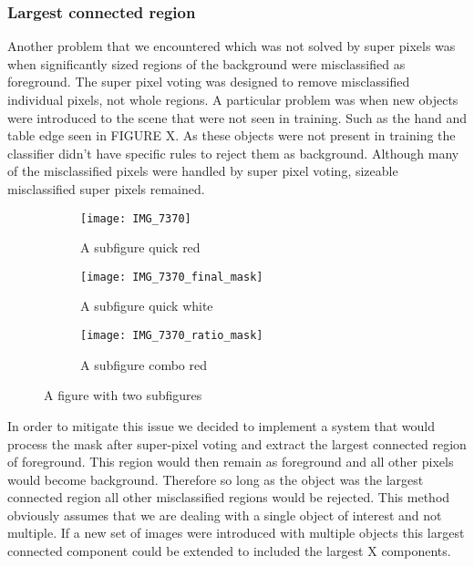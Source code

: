 \documentclass[12pt]{IIBproject}
\begin{document}
\subsubsection{Largest connected region}
Another problem that we encountered which was not solved by super pixels was when significantly sized regions of the background were misclassified as foreground. The super pixel voting was designed to remove misclassified individual pixels, not whole regions. A particular problem was when new objects were introduced to the scene that were not seen in training. Such as the hand and table edge seen in FIGURE X. As these objects were not present in training the classifier didn't have specific rules to reject them as background. Although many of the misclassified pixels were handled by super pixel voting, sizeable misclassified super pixels remained.
\begin{figure}[H]
\centering
\begin{subfigure}{.33\textwidth}
  \centering
  \texttt{[image: IMG\_7370]}
  \caption{A subfigure quick red}
  \label{fig:sub2}
\end{subfigure}
\begin{subfigure}{.33\textwidth}
  \centering
  \texttt{[image: IMG\_7370\_final\_mask]}
  \caption{A subfigure quick white}
  \label{fig:sub1}
\end{subfigure}%
\begin{subfigure}{.33\textwidth}
  \centering
  \texttt{[image: IMG\_7370\_ratio\_mask]}
  \caption{A subfigure combo red}
  \label{fig:sub2}
\end{subfigure}

\caption{A figure with two subfigures}
\label{fig:test}
\end{figure}
In order to mitigate this issue we decided to implement a system that would process the mask after super-pixel voting and extract the largest connected region of foreground. This region would then remain as foreground and all other pixels would become background. Therefore so long as the object was the largest connected region all other misclassified regions would be rejected. This method obviously assumes that we are dealing with a single object of interest and not multiple. If a new set of images were introduced with multiple objects this largest connected component could be extended to included the largest X components. 
\end{document}
